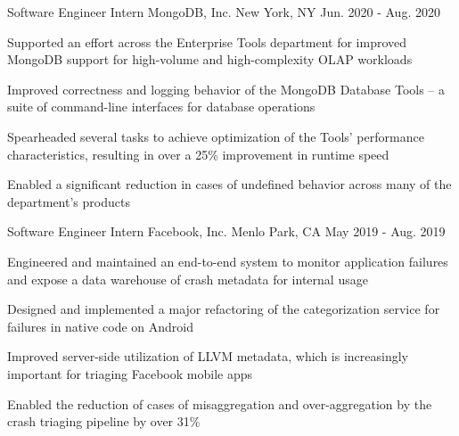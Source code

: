 


\begin{cventries}

  \cventry
  {Software Engineer Intern} %
  {MongoDB, Inc.} %
  {New York, NY} %
  {Jun. 2020 - Aug. 2020} %
  { %
    \begin{cvitems}
        \item {Supported an effort across the Enterprise Tools department for improved MongoDB support for high-volume and high-complexity OLAP workloads}
        \item {Improved correctness and logging behavior of the MongoDB Database Tools -- a suite of command-line interfaces for database operations}
        \item {Spearheaded several tasks to achieve optimization of the Tools' performance characteristics, resulting in over a 25\% improvement in runtime speed}
        \item {Enabled a significant reduction in cases of undefined behavior across many of the department's products}
    \end{cvitems}
  }
  
  \cventry
  {Software Engineer Intern} %
  {Facebook, Inc.} %
  {Menlo Park, CA} %
  {May 2019 - Aug. 2019} %
  { %
    \begin{cvitems}
        \item {Engineered and maintained an end-to-end system to monitor application failures and expose a data warehouse of crash metadata for internal usage}
        \item {Designed and implemented a major refactoring of the categorization service for failures in native code on Android}
        \item {Improved server-side utilization of LLVM metadata, which is increasingly important for triaging Facebook mobile apps}
        \item {Enabled the reduction of cases of misaggregation and over-aggregation by the crash triaging pipeline by over 31\%}
    \end{cvitems}
  }
\end{cventries}
